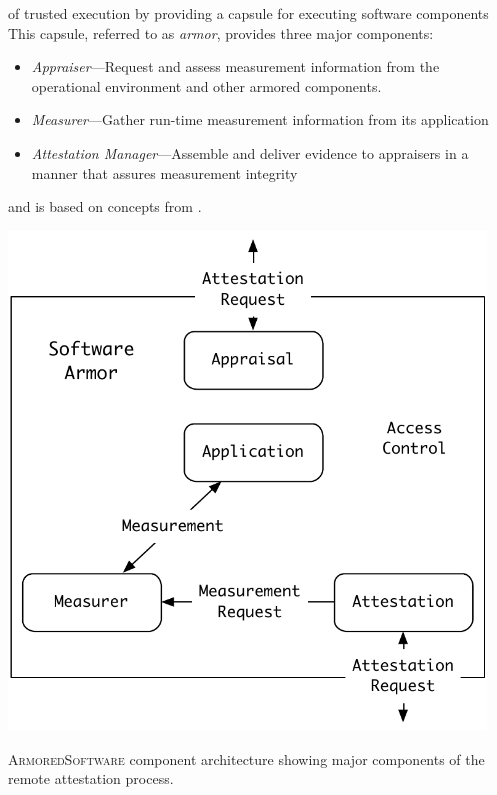 \documentclass{tufte-handout}
\begin{document}

 of trusted execution
by providing a capsule for executing software components This capsule,
referred to as \emph{armor}, provides three major components:

\begin{itemize}
  \parskip=0pt\itemsep=0pt
\item \emph{Appraiser}---Request and assess measurement information from
  the operational environment and other armored components.
\item \emph{Measurer}---Gather run-time measurement information from its
  application
\item \emph{Attestation Manager}---Assemble and deliver evidence to appraisers in a
  manner that assures measurement integrity
\end{itemize}

\noindent and is based on concepts from \citet{Coker::Principles-of-R}. 

\newpage

\begin{marginfigure}
  \centering
  \includegraphics[width=0.95\textwidth]{figures/architecture.pdf}
  \caption{\textsc{ArmoredSoftware} component architecture showing
    major components of the remote attestation process.}
  \label{fig:architecture}
\end{marginfigure}
\end{document}

